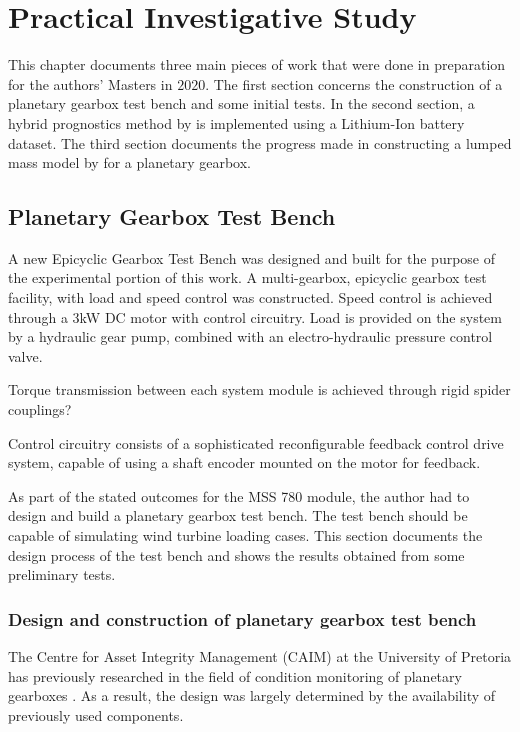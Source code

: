 
\chapter{Practical Investigative Study} \label{S:Practical}
This chapter documents three main pieces of work that were done in preparation for the authors' Masters in $2020$. The first section concerns the construction of a planetary gearbox test bench and some initial tests. In the second section, a hybrid prognostics method by \cite{Liao2016} is implemented using a Lithium-Ion battery dataset. The third section documents the progress made in constructing a lumped mass model by \cite{Chaari2006} for a planetary gearbox.

\section{Planetary Gearbox Test Bench}


A new Epicyclic Gearbox Test Bench was designed and built for the purpose of the experimental portion of this work. A multi-gearbox, epicyclic gearbox test facility, with load and speed control was constructed. Speed control is achieved through a 3kW DC motor with control circuitry. Load is provided on the system by a hydraulic gear pump, combined with an electro-hydraulic pressure control valve. \cite{Schon2005}

Torque transmission between each system module is achieved through rigid spider couplings? \cite{Schon2005}

Control circuitry consists of a sophisticated reconfigurable feedback control drive system, capable of using a shaft encoder mounted on the motor for feedback.








As part of the stated outcomes for the MSS 780 module, the author had to design and build a planetary gearbox test bench. The test bench should be capable of simulating wind turbine loading cases. This section documents the design process of the test bench and shows the results obtained from some preliminary tests.
\subsection{Design and construction of planetary gearbox test bench}
The Centre for Asset Integrity Management (CAIM) at the University of Pretoria has previously researched in the field of condition monitoring of planetary gearboxes \citep{Schon2005,Smidt2009}. As a result, the design was largely determined by the availability of previously used components. 

